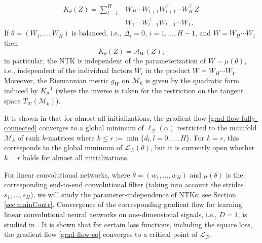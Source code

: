 \documentclass[twoside]{article}
\theoremstyle{definition}
\theoremstyle{remark}
\begin{document}
\begin{align}
\label{NTK-fully-general} \textstyle
K_\theta(Z) = \sum_{l=1}^H  & W_H \cdots W_{l+1} W_{l+1}^\top \cdots W_H^\top \, Z\, \nonumber \\ & W_1^\top \cdots W_{l-1}^\top W_{l-1} \cdots W_1.
\end{align}
If $\theta=(W_1,\hdots,W_H)$ is balanced, i.e., $\Delta_i = 0$, $i=1,\hdots,H-1$, and $W=W_H \cdots W_1$ then 
\[
K_\theta(Z) = \mathcal{A}_{W}(Z);
\]
in particular, the NTK is independent of the parameterization of $W = \mu(\theta)$, i.e., independent of the individual factors $W_l$ in the product $W= W_H \cdots W_1$. Moreover, the Riemannian metric $g_W$ on $\mathcal{M}_k$ is given by the quadratic form induced by $K_\theta^{-1}$ (where the inverse is taken for the restriction on the tangent space $T_W(\mathcal{M}_k)$).

It is shown in \cite{bah2022learning} that for almost all initializations, the gradient flow \eqref{grad-flow-fully-connected} converges to a global minimum of $\ell_{\mathcal{D}}(\alpha)$ restricted to the manifold
$\mathcal{M}_k$ of rank $k$-matrices where $k \leq r := \min\{d_l, l=0,\hdots,H\}$. For $k = r$, this corresponds to the global minimum of $\mathcal{L}_{\mathcal{D}}(\theta)$, but it is currently open whether $k=r$ holds for almost all initializations.

 

For linear convolutional networks, where $\theta = (w_1,\hdots,w_H)$ and $\mu(\theta)$ is the corresponding end-to-end convolutional filter (taking into account the strides $s_1,\hdots,s_H$), we will study the parameter-independence of NTKs; see Section \ref{sec:mainContr}. Convergence of the corresponding gradient flow for learning linear convolutional neural networks on one-dimensional signals, i.e., $D=1$, is studied in \cite{dirati25}. It is shown that for certain loss functions, including the square loss, the gradient flow \eqref{grad-flow-eq} converges to a critical point of $\mathcal{L}_{\mathcal{D}}$.
\end{document}
